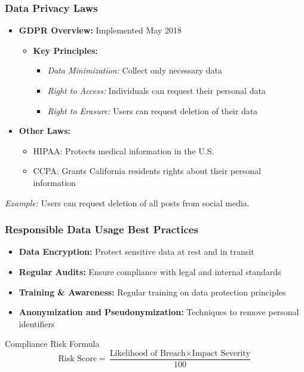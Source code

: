 \documentclass[aspectratio=169]{beamer}
\begin{document}
\begin{frame}[fragile]
    \frametitle{Data Privacy Laws}
    \begin{itemize}
        \item \textbf{GDPR Overview:} Implemented May 2018
            \begin{itemize}
                \item \textbf{Key Principles:}
                    \begin{itemize}
                        \item \textit{Data Minimization:} Collect only necessary data
                        \item \textit{Right to Access:} Individuals can request their personal data
                        \item \textit{Right to Erasure:} Users can request deletion of their data
                    \end{itemize}
                \end{itemize}
        \item \textbf{Other Laws:}
            \begin{itemize}
                \item HIPAA: Protects medical information in the U.S.
                \item CCPA: Grants California residents rights about their personal information
            \end{itemize}
    \end{itemize}
    \vspace{0.5cm}
    \textit{Example:} Users can request deletion of all posts from social media.
\end{frame}

\begin{frame}[fragile]
    \frametitle{Responsible Data Usage Best Practices}
    \begin{itemize}
        \item \textbf{Data Encryption:} Protect sensitive data at rest and in transit
        \item \textbf{Regular Audits:} Ensure compliance with legal and internal standards
        \item \textbf{Training \& Awareness:} Regular training on data protection principles
        \item \textbf{Anonymization and Pseudonymization:} Techniques to remove personal identifiers
    \end{itemize}
    \vspace{0.5cm}
    \begin{block}{Compliance Risk Formula}
        \begin{equation}
            \text{Risk Score} = \frac{\text{Likelihood of Breach} \times \text{Impact Severity}}{100}
        \end{equation}
    \end{block}
\end{frame}
\end{document}
